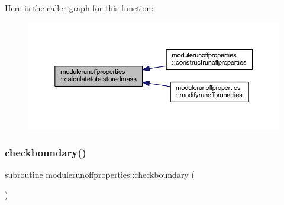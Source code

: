 Here is the caller graph for this function\+:\nopagebreak
\begin{figure}[H]
\begin{center}
\leavevmode
\includegraphics[width=350pt]{namespacemodulerunoffproperties_a6cac2121fb78c6414c74fdfb38dafcb1_icgraph}
\end{center}
\end{figure}
\mbox{\label{namespacemodulerunoffproperties_aad3a8c2b2f6443fbd1a8c4ef4f14a275}} 
\subsubsection{\texorpdfstring{checkboundary()}{checkboundary()}}
{\footnotesize\ttfamily subroutine modulerunoffproperties\+::checkboundary (\begin{DoxyParamCaption}{ }\end{DoxyParamCaption})\hspace{0.3cm}{\ttfamily [private]}}

